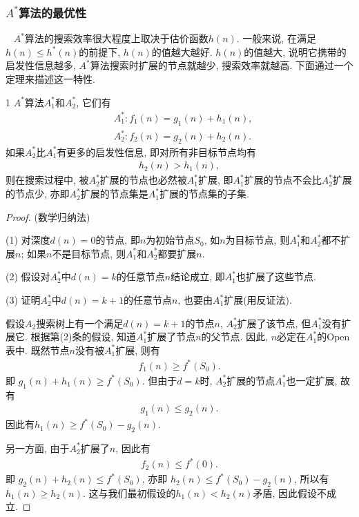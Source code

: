 \subsubsection{$A^*$算法的最优性}~{}
$A^*$算法的搜索效率很大程度上取决于估价函数$h(n)$. 一般来说, 在满足$h(n) \leq h^*(n)$的前提下, $h(n)$的值越大越好.
$h(n)$的值越大, 说明它携带的启发性信息越多, $A^*$算法搜索时扩展的节点就越少, 搜索效率就越高.
下面通过一个定理来描述这一特性.
\begin{mythm}{}{1}
    $A^*$算法$A_1^*$和$A_2^*$, 它们有
\begin{align}
    &A_1^*:  f_1(n)=g_1(n)+h_1(n),\\
    &A_2^*:  f_2(n)=g_2(n)+h_2(n).
\end{align}
如果$A_2^*$比$A_1^*$有更多的启发性信息, 即对所有非目标节点均有
\begin{align}
     h_2(n)>h_1(n),
\end{align}
则在搜索过程中, 被$A_2^*$扩展的节点也必然被$A_1^*$扩展, 即$A_1^*$扩展的节点不会比$A_2^*$扩展的节点少, 亦即$A_2^*$扩展的节点集是$A_1^*$扩展的节点集的子集.
\end{mythm}
\begin{proof}
(数学归纳法)

(1) 对深度$d(n)=0$的节点, 即$n$为初始节点$S_0$, 如$n$为目标节点, 则$A_1^*$和$A_2^*$都不扩展$n$; 如果$n$不是目标节点, 则$A_1^*$和$A_2^*$都要扩展$n$.

(2) 假设对$A_2^*$中$d(n)=k$的任意节点$n$结论成立, 即$A_1^*$也扩展了这些节点.

(3) 证明$A_2^*$中$d(n)=k+1$的任意节点$n$, 也要由$A_1^*$扩展(用反证法).

假设$A_2$搜索树上有一个满足$d(n)=k+1$的节点$n$, $A_2^*$扩展了该节点, 但$A_1^*$没有扩展它.
根据第(2)条的假设, 知道$A_1^*$扩展了节点$n$的父节点. 因此, $n$必定在$A_1^*$的Open表中. 既然节点$n$没有被$A_1^*$扩展, 则有
\begin{align}
     f_1(n)\geq f^*(S_0).
\end{align}
即 $g_1(n)+h_1(n)\geq f^*(S_0)$. 但由于$d=k$时, $A_2^*$扩展的节点$A_1^*$也一定扩展, 故有
\begin{align}
    g_1(n)\leq g_2(n).
\end{align}
因此有$h_1(n)\geq f^*(S_0)-g_2(n)$.

另一方面, 由于$A_2^ *$扩展了$n$, 因此有
\begin{align}
     f_2(n)\leq f^*(0).
\end{align}
即   $g_2(n)+h_2(n)\leq f^*(S_0)$, 亦即 $h_2(n)\leq f^*(S_0)-g_2(n)$, 所以有 $ h_1(n)\geq h_2(n)$.
这与我们最初假设的$h_1(n)<h_2(n)$矛盾, 因此假设不成立.
\end{proof}


